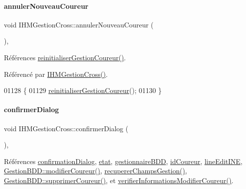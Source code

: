 \paragraph{\texorpdfstring{annuler\+Nouveau\+Coureur}{annulerNouveauCoureur}}
{\footnotesize\ttfamily void I\+H\+M\+Gestion\+Cross\+::annuler\+Nouveau\+Coureur (\begin{DoxyParamCaption}{ }\end{DoxyParamCaption})\hspace{0.3cm}{\ttfamily [private]}, {\ttfamily [slot]}}



Références \hyperlink{class_i_h_m_gestion_cross_a85c44933ec0dcbb591e01c832063367e}{reinitialiser\+Gestion\+Coureur()}.



Référencé par \hyperlink{class_i_h_m_gestion_cross_a2c62fd83326a87456a403f46acc408c8}{I\+H\+M\+Gestion\+Cross()}.


\begin{DoxyCode}
01128 \{
01129     \hyperlink{class_i_h_m_gestion_cross_a85c44933ec0dcbb591e01c832063367e}{reinitialiserGestionCoureur}();
01130 \}
\end{DoxyCode}
\mbox{\label{class_i_h_m_gestion_cross_a144933ab31ae263be7267b93bfd53a82}} 
\paragraph{\texorpdfstring{confirmer\+Dialog}{confirmerDialog}}
{\footnotesize\ttfamily void I\+H\+M\+Gestion\+Cross\+::confirmer\+Dialog (\begin{DoxyParamCaption}{ }\end{DoxyParamCaption})\hspace{0.3cm}{\ttfamily [private]}, {\ttfamily [slot]}}



Références \hyperlink{class_i_h_m_gestion_cross_a417b63ff11c3be6623d17718d9058768}{confirmation\+Dialog}, \hyperlink{class_i_h_m_gestion_cross_a5da4390d71dbd5d05cff339f93c7c85a}{etat}, \hyperlink{class_i_h_m_gestion_cross_a440bac63a3e51db3e2c08e883f8cafc9}{gestionnaire\+B\+DD}, \hyperlink{class_i_h_m_gestion_cross_a9352a649126c14e7d0da3694c10c3cef}{id\+Coureur}, \hyperlink{class_i_h_m_gestion_cross_ab6c32fd079f81c4fa0b9ec0b4ef9bb61}{line\+Edit\+I\+NE}, \hyperlink{class_gestion_b_d_d_afad096d7e405d35a818d4858ee34df61}{Gestion\+B\+D\+D\+::modifier\+Coureur()}, \hyperlink{class_i_h_m_gestion_cross_a271efe8d31fbe05fccfb2dc81e71971a}{recuperer\+Champs\+Gestion()}, \hyperlink{class_gestion_b_d_d_afe47ec92274b7998131c5d4e6551d177}{Gestion\+B\+D\+D\+::supprimer\+Coureur()}, et \hyperlink{class_i_h_m_gestion_cross_a0e088653019d8adefb371348f272d2e2}{verifier\+Informations\+Modifier\+Coureur()}.



